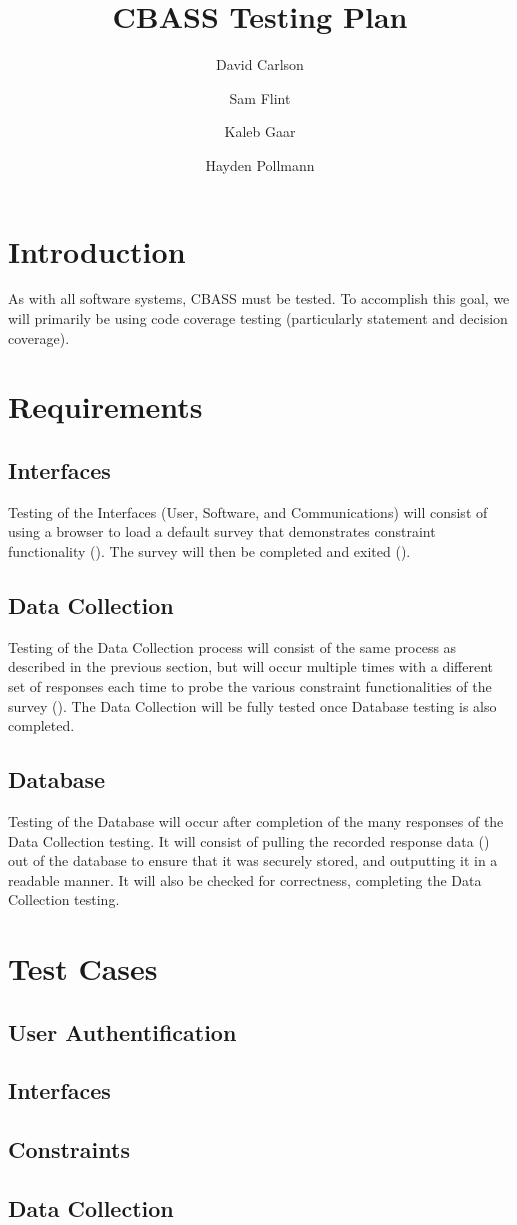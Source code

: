 \documentclass[10pt]{article}
\title{CBASS Testing Plan}
\author{David Carlson \and Sam Flint \and Kaleb Gaar \and Hayden
  Pollmann}
\begin{document}
\maketitle

\section{Introduction}

As with all software systems, CBASS must be tested.  To accomplish
this goal, we will primarily be using code coverage testing
(particularly statement and decision coverage).

\section{Requirements}

\subsection{Interfaces}
Testing of the Interfaces (User, Software, and Communications) will
consist of using a browser to load a default survey that demonstrates
constraint functionality (). The survey will then be
completed and exited ().

\subsection{Data Collection}
Testing of the Data Collection process will consist of the same
process as described in the previous section, but will occur multiple
times with a different set of responses each time to probe the various
constraint functionalities of the survey (). The Data
Collection will be fully tested once Database testing is also
completed.

\subsection{Database}
Testing of the Database will occur after completion of the many
responses of the Data Collection testing. It will consist of pulling
the recorded response data () out of the database to
ensure that it was securely stored, and outputting it in a readable
manner. It will also be checked for correctness, completing the Data
Collection testing.


\section{Test Cases}

\subsection{User Authentification}

\subsection{Interfaces}

\subsection{Constraints}

\subsection{Data Collection}
\end{document}
